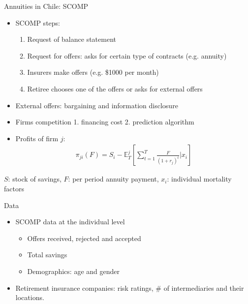 \documentclass[notes, 10pt,aspectratio=169]{beamer}
\begin{document}
\begin{frame}{Annuities in Chile: SCOMP}  \label{slide:setting}
    
    \begin{itemize}%
   
\end{itemize} 
    \begin{itemize}%
    \item SCOMP steps: 
    \begin{enumerate}
        \item Request of balance statement 
        \item Request for offers: asks for certain type of contracts (e.g. annuity)
        \item Insurers make offers (e.g. \$1000 per month)
        \item Retiree chooses one of the offers or asks for external offers

    \end{enumerate}

        \item External offers: bargaining and information disclosure
    

    \item Firms competition 1. financing cost 2. prediction algorithm 

    \item Profits of firm $j$: 
    \begin{align*}
    \pi_{ji}(F) = S_i-  \mathbb{E}^j_{T} \left[\sum_{t=1}^T\frac{F}{(1+r_j)^t}|x_i \right]
    \end{align*}
    \end{itemize}

     $S$: stock of savings, $F$: per period annuity payment, $x_i$: individual mortality factors
    
\end{frame}


 \begin{frame}{Data} \label{slide:data}
\begin{itemize}
    \item SCOMP data at the individual level  
    \begin{itemize}
        \item Offers received, rejected and accepted 
        \item Total savings 
        \item Demographics: age and gender
    \end{itemize}
     \item Retirement insurance companies: risk ratings, \#  of intermediaries and their  locations.
\end{itemize}
\textbf{}

\textbf{}
\end{frame}
\end{document}
